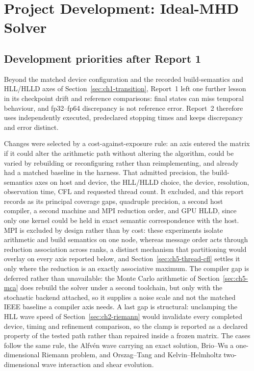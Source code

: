 
\chapter{Project Development: Ideal-MHD Solver}
\label{chap:development}

\section{Development priorities after Report 1}
\label{sec:ch2-priorities}

Beyond the matched device configuration and the recorded build-semantics and
HLL/HLLD axes of Section~\ref{sec:ch1-transition}, Report~1 left one further
lesson in its checkpoint drift and reference comparisons: final states can miss
temporal behaviour, and fp32--fp64 discrepancy is not reference error. Report~2
therefore uses independently executed, predeclared stopping times and keeps
discrepancy and error distinct.

Changes were selected by a cost-against-exposure rule: an axis entered the
matrix if it could alter the arithmetic path without altering the algorithm,
could be varied by rebuilding or reconfiguring rather than reimplementing, and
already had a matched baseline in the harness. That admitted precision, the
build-semantics axes on host and device, the HLL/HLLD choice, the device,
resolution, observation time, CFL and requested thread count. It excluded, and
this report records as its principal coverage gaps, quadruple precision, a
second host compiler, a second machine and MPI reduction order, and
GPU HLLD, since only one kernel could be held in exact semantic correspondence
with the host. MPI is excluded by design rather than by cost: these experiments
isolate arithmetic and build semantics on one node, whereas message order acts
through reduction association across ranks, a distinct mechanism that
partitioning would overlay on every axis reported below, and
Section~\ref{sec:ch5-thread-cfl} settles it only where the reduction is an
exactly associative maximum. The compiler gap is
deferred rather than unavailable: the Monte
Carlo arithmetic of Section~\ref{sec:ch5-mca} does rebuild the solver under a
second toolchain, but only with the stochastic backend attached, so it supplies
a noise scale and not the matched IEEE baseline a compiler axis needs. A last
gap is structural: unclamping the HLL wave speed of
Section~\ref{sec:ch2-riemann} would invalidate every completed device, timing
and refinement comparison, so the clamp is reported as a declared property of
the tested path rather than repaired inside a frozen matrix. The cases follow
the same rule, the Alfv\'en wave carrying an exact solution, Brio--Wu a
one-dimensional Riemann problem, and Orszag--Tang and Kelvin--Helmholtz
two-dimensional wave interaction and shear evolution.

